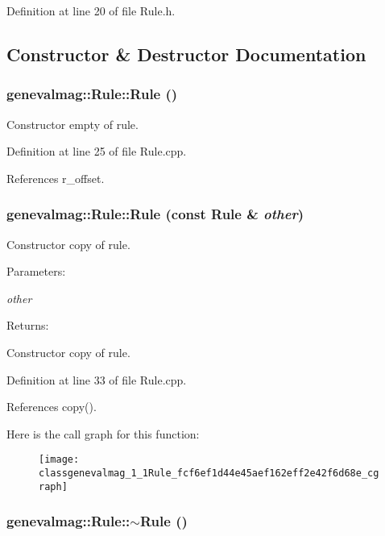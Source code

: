 Definition at line 20 of file Rule.h.

\subsection{Constructor \& Destructor Documentation}
\hypertarget{classgenevalmag_1_1Rule_1c442e245962ae690729738c7b520c1e}{
\subsubsection[{Rule}]{\setlength{\rightskip}{0pt plus 5cm}genevalmag::Rule::Rule ()}}
\label{classgenevalmag_1_1Rule_1c442e245962ae690729738c7b520c1e}


Constructor empty of rule. 

Definition at line 25 of file Rule.cpp.

References r\_\-offset.\hypertarget{classgenevalmag_1_1Rule_fcf6ef1d44e45aef162eff2e42f6d68e}{
\subsubsection[{Rule}]{\setlength{\rightskip}{0pt plus 5cm}genevalmag::Rule::Rule (const {\bf Rule} \& {\em other})}}
\label{classgenevalmag_1_1Rule_fcf6ef1d44e45aef162eff2e42f6d68e}


Constructor copy of rule. \begin{Desc}
\item[Parameters:]
\begin{description}
\item[{\em other}]\end{description}
\end{Desc}
\begin{Desc}
\item[Returns:]\end{Desc}
Constructor copy of rule. 

Definition at line 33 of file Rule.cpp.

References copy().

Here is the call graph for this function:\nopagebreak
\begin{figure}[H]
\begin{center}
\leavevmode
\texttt{[image: classgenevalmag\_1\_1Rule\_fcf6ef1d44e45aef162eff2e42f6d68e\_cgraph]}
\end{center}
\end{figure}
\hypertarget{classgenevalmag_1_1Rule_70a5808ffd4cbce7f8cb3daf4ed1aa71}{
\subsubsection[{$\sim$Rule}]{\setlength{\rightskip}{0pt plus 5cm}genevalmag::Rule::$\sim$Rule ()}}
\label{classgenevalmag_1_1Rule_70a5808ffd4cbce7f8cb3daf4ed1aa71}


